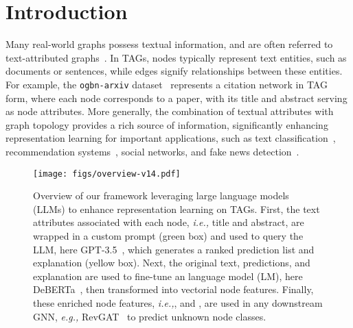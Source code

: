 \documentclass{article}
\newcommand{\ie}{\emph{i.e.,}\xspace}
\newcommand{\eg}{\emph{e.g.,}\xspace}
\begin{document}
\section{Introduction}
Many real-world graphs possess textual information, and are often referred to text-attributed graphs~\citep{yang2021graphformers}. In TAGs, nodes typically represent text entities, such as documents or sentences, while edges signify relationships between these entities. For example, the \texttt{ogbn-arxiv} dataset~\citep{hu2020open} represents a citation network in TAG form, where each node corresponds to a paper, with its title and abstract serving as node attributes. More generally, the combination of textual attributes with graph topology provides a rich source of information,  significantly enhancing representation learning for important applications, such as text classification~\citep{yang2015network_TADW, wang2016linked, yasunaga2017graph, chien2021node_giant, zhao2022learning_em}, recommendation systems~\citep{zhu2021textgnn}, social networks, and fake news detection~\citep{liu2019fine_fact_verify}.


\begin{figure}[t]
\vspace{-0.6cm}
    \centering
    \texttt{[image: figs/overview-v14.pdf]}
    \caption{Overview of our framework leveraging large language models (LLMs) to enhance representation learning on TAGs. First, the text attributes associated with each node, \ie title and abstract, are wrapped in a custom prompt (green box) and used to query the LLM, here GPT-3.5~\citep{brown2020language_gpt}, which generates a ranked prediction list and explanation (yellow box). Next, the original text, predictions, and explanation are used to fine-tune an language model (LM), here DeBERTa~\citep{he2021deberta}, then transformed into vectorial node features. Finally, these enriched node features, \ie ,  and , are used in any downstream GNN, \eg RevGAT~\citep{li2021training_revgat} to predict unknown node classes.}
\label{fig: overview}
    \vspace{-0.4cm}
\end{figure}
\end{document}
